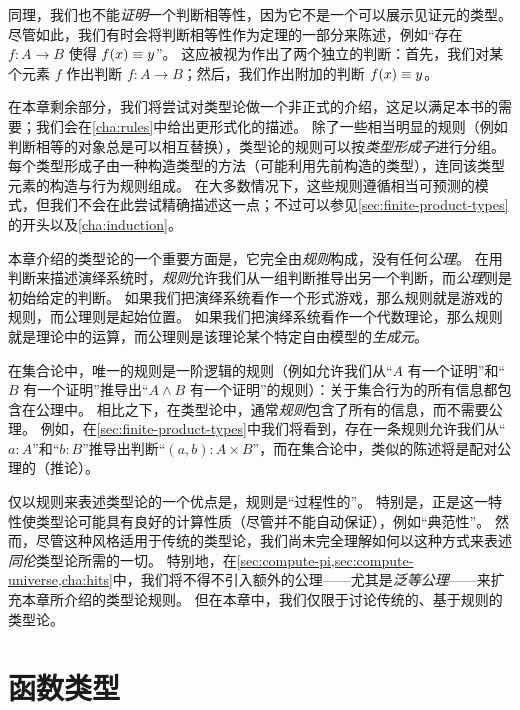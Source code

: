 同理，我们也不能\emph{证明}一个判断相等性，因为它不是一个可以展示见证元的类型。
尽管如此，我们有时会将判断相等性作为定理的一部分来陈述，例如``存在 $f:A\to B$ 使得 $f(x)\equiv y$''。
这应被视为作出了两个独立的判断：首先，我们对某个元素 $f$ 作出判断 $f:A\to B$；然后，我们作出附加的判断 $f(x)\equiv y$。

在本章剩余部分，我们将尝试对类型论做一个非正式的介绍，这足以满足本书的需要；我们会在\cref{cha:rules}中给出更形式化的描述。
除了一些相当明显的规则（例如判断相等的对象总是可以相互替换），类型论的规则可以按\emph{类型形成子}进行分组。
每个类型形成子由一种构造类型的方法（可能利用先前构造的类型），连同该类型元素的构造与行为规则组成。
在大多数情况下，这些规则遵循相当可预测的模式，但我们不会在此尝试精确描述这一点；不过可以参见\cref{sec:finite-product-types}的开头以及\cref{cha:induction}。

%
%
本章介绍的类型论的一个重要方面是，它完全由\emph{规则}构成，没有任何\emph{公理}。
在用判断来描述演绎系统时，\emph{规则}允许我们从一组判断推导出另一个判断，而\emph{公理}则是初始给定的判断。
如果我们把演绎系统看作一个形式游戏，那么规则就是游戏的规则，而公理则是起始位置。
如果我们把演绎系统看作一个代数理论，那么规则就是理论中的运算，而公理则是该理论某个特定自由模型的\emph{生成元}。

在集合论中，唯一的规则是一阶逻辑的规则（例如允许我们从``$A$ 有一个证明''和``$B$ 有一个证明''推导出``$A\wedge B$ 有一个证明''的规则）：关于集合行为的所有信息都包含在公理中。
相比之下，在类型论中，通常\emph{规则}包含了所有的信息，而不需要公理。
例如，在\cref{sec:finite-product-types}中我们将看到，存在一条规则允许我们从``$a:A$''和``$b:B$''推导出判断``$(a,b):A\times B$''，而在集合论中，类似的陈述将是配对公理的（推论）。

仅以规则来表述类型论的一个优点是，规则是``过程性的''。
特别是，正是这一特性使类型论可能具有良好的计算性质（尽管并不能自动保证），例如``典范性''。
然而，尽管这种风格适用于传统的类型论，我们尚未完全理解如何以这种方式来表述\emph{同伦}类型论所需的一切。
特别地，在\cref{sec:compute-pi,sec:compute-universe,cha:hits}中，我们将不得不引入额外的公理——尤其是\emph{泛等公理}——来扩充本章所介绍的类型论规则。
但在本章中，我们仅限于讨论传统的、基于规则的类型论。

\section{函数类型}
\label{sec:function-types}

